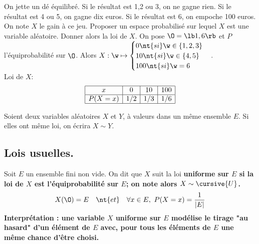 \documentclass[11pt]{article}
\begin{document}
\pagebreak

\begin{ex}{}{}
    On jette un dé équilibré. Si le résultat est 1,2 ou 3, on ne gagne rien. Si le résultat est 4 ou 5, on gagne dix euros. Si le résultat est 6, on empoche 100 euros.\\
    On note $X$ le gain à ce jeu. Proposer un espace probabilisé sur lequel $X$ est une variable aléatoire. Donner alors la loi de $X$.
    \tcblower
    On pose $\O=\lb1,6\rb$ et $P$ l'équiprobabilité sur $\O$. Alors $X:\w\mapsto\begin{cases}0 \nt{ si } \w\in\{1,2,3\}\\10\nt{ si } \w\in\{4,5\}\\100\nt{ si } \w=6\end{cases}$.\\
    Loi de $X$:
    \begin{eqnarray*}
        \begin{array}{|c|c|c|c|}
            \hline
            x & 0 & 10 & 100\\
            \hline
            P(X=x) & 1/2 & 1/3 & 1/6\\
            \hline
        \end{array}
    \end{eqnarray*}
\end{ex}

\begin{nota}{}{}
    Soient deux variables aléatoires $X$ et $Y$, à valeurs dans un même ensemble $E$. Si elles ont même loi, on écrira $X\sim Y$.
\end{nota}

\subsection{Lois usuelles.}

\begin{defi}{}{}
    Soit $E$ un ensemble fini non vide. On dit que $X$ suit la loi \bf{uniforme} sur $E$ si la loi de $X$ est l'équiprobabilité sur $E$; on note alors $X\sim\cursive{U}$.
    \begin{equation*}
        X(\O)=E \quad \nt{et} \quad \forall x\in E, ~ P(X=x) = \frac{1}{|E|}
    \end{equation*}
    Interprétation : une variable $X$ uniforme sur $E$ modélise le tirage "au hasard" d'un élément de $E$ avec, pour tous les éléments de $E$ une même chance d'être choisi.
\end{defi}
\end{document}
